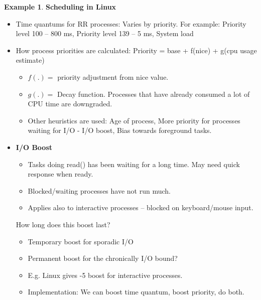 \documentclass[12pt,a4paper]{article}
\theoremstyle{definition}
\newtheorem{example}{Example}[section]
\newenvironment{myitemize}
{ \begin{itemize}
    \setlength{\itemsep}{5pt}
    \setlength{\parskip}{0pt}
    \setlength{\parsep}{0pt}     }
{ \end{itemize}                  }
\begin{document}
\begin{example}{\textbf{Scheduling in Linux}}
\begin{myitemize}
\begin{tcolorbox}
			\begin{myitemize}
				\item CPU time used so far is recorded. Process is moved to a queue of blocked processes.
				\item When process becomes runnable again, it continues running until its time quantum is expired.
				\item It is then moved to the expired set.
				\item When a process becomes blocked its priority is often upgraded (see later). 
			\end{myitemize}
		\end{tcolorbox}
		\item Time quantums for RR processes: Varies by priority. For example: Priority level 100 – 800 ms, Priority level 139 – 5 ms, System load
		\item How process priorities are calculated: Priority = base + f(nice) + g(cpu usage estimate)
		\begin{myitemize}
			\item $f(.) =$ priority adjustment from nice value.
			\item $g(.) =$ Decay function. Processes that have already consumed a lot of CPU time are downgraded.
			\item Other heuristics are used: Age of process, More priority for processes waiting for I/O - I/O boost, Bias towards foreground tasks.
		\end{myitemize}
		\item \textbf{I/O Boost}
		\begin{myitemize}
			\item Tasks doing read() has been waiting for a long time. May need quick response when ready.
			\item Blocked/waiting processes have not run much.
			\item Applies also to interactive processes – blocked on keyboard/mouse input.
		\end{myitemize}
		\begin{tcolorbox}
			\textsf{How long does this boost last?}
			\begin{myitemize}
				\item Temporary boost for sporadic I/O
				\item Permanent boost for the chronically I/O bound?
				\item E.g. Linux gives -5 boost for interactive processes.
				\item Implementation: We can boost time quantum, boost priority, do both.
			\end{myitemize}
		\end{tcolorbox}
	\end{myitemize}
\end{example}
\end{document}
